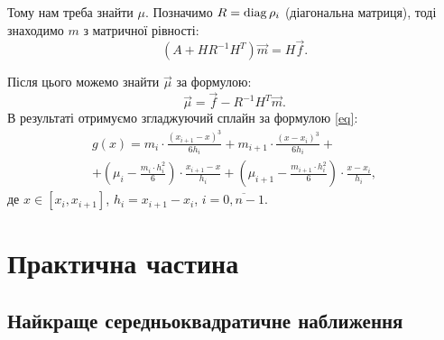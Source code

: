 Тому нам треба знайти $\mu$. Позначимо $R = \operatorname{diag} \rho_i$ (діагональна матриця), тоді знаходимо $m$ з матричної рівності: \[ (A + H R^{-1} H^T) \vec m = H \vec f.\]

Після цього можемо знайти $\vec \mu$ за формулою: \[\vec \mu = \vec f - R^{-1} H^{T} \vec m.\] В результаті отримуємо згладжуючий сплайн за формулою \eqref{eq}:
\begin{multline*}
    g(x) = m_i \cdot \frac{(x_{i + 1} - x)^3}{6 h_i} + m_{i + 1} \cdot \frac{(x - x_i)^3}{6 h_i} + \\
    + \left( \mu_i - \frac{m_i \cdot h_i^2}{6} \right) \cdot \frac{x_{i + 1} - x}{h_i} + \left( \mu_{i + 1} - \frac{m_{i + 1} \cdot h_i^2}{6}\right) \cdot \frac{x - x_i}{h_i}, 
\end{multline*}
де $x \in [x_i, x_{i + 1}]$, $h_i = x_{i + 1} - x_i$, $i = \overline{0, n - 1}$.

\section{Практична частина}

\subsection{Найкраще середньоквадратичне наближення}



